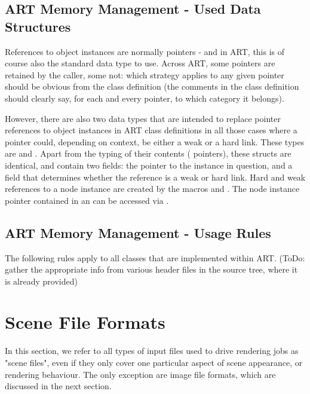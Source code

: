 \section{ART Memory Management - Used Data Structures}

References to object instances are normally pointers - and in ART, this is of course also the standard data type to use. Across ART, some pointers are retained by the caller, some not: which strategy applies to any given pointer should be obvious from the class definition (\ie the comments in the class definition should clearly say, for each and every pointer, to which category it belongs).

However, there are also two data types that are intended to replace pointer references to object instances in ART class definitions in all those cases where a pointer could, depending on context, be either a weak or a hard link. These types are \textbf{} and \textbf{}. Apart from the typing of their contents ( \vs {} pointers), these structs are identical, and contain two fields: the pointer to the instance in question, and a field that determines whether the reference is a weak or hard link. Hard and weak references to a node instance are created by the macros  and  . The node instance pointer contained in an  can be accessed via .

\section{ART Memory Management - Usage Rules}

The following rules apply to all classes that are implemented within ART. (ToDo: gather the appropriate info from various header files in the source tree, where it is already provided)


\chapter{Scene File Formats}
\label{sec:scenefileformats}

In this section, we refer to all types of input files used to drive rendering jobs as "scene files", even if they only cover one particular aspect of scene appearance, or rendering behaviour. The only exception are image file formats, which are discussed in the next section.

